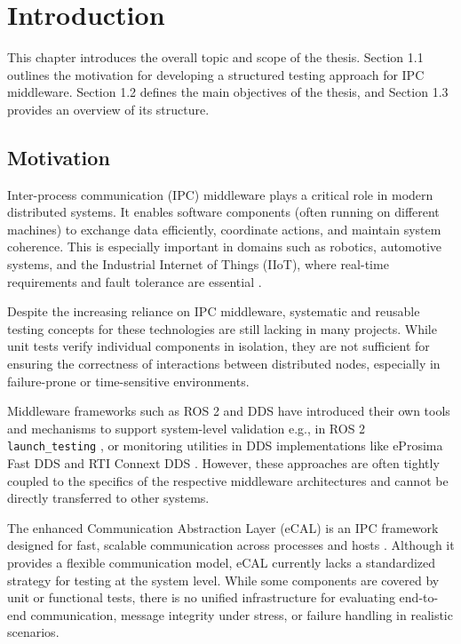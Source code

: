 \clearpage

\section{Introduction}

This chapter introduces the overall topic and scope of the thesis. Section 1.1 outlines the motivation for developing a structured testing approach for IPC middleware. Section 1.2 defines the main objectives of the thesis, and Section 1.3 provides an overview of its structure.

\subsection{Motivation}

Inter-process communication (IPC) middleware plays a critical role in modern distributed systems. It enables software components (often running on different machines) to exchange data efficiently, coordinate actions, and maintain system coherence. This is especially important in domains such as robotics, automotive systems, and the Industrial Internet of Things (IIoT), where real-time requirements and fault tolerance are essential \cite{coulouris2012}.

\vspace{1em}
Despite the increasing reliance on IPC middleware, systematic and reusable testing concepts for these technologies are still lacking in many projects. While unit tests verify individual components in isolation, they are not sufficient for ensuring the correctness of interactions between distributed nodes, especially in failure-prone or time-sensitive environments.

\vspace{1em}
Middleware frameworks such as ROS 2 and DDS have introduced their own tools and mechanisms to support system-level validation e.g., in ROS 2  \texttt{launch\_testing} \cite{ros2_launch_testing}, or monitoring utilities in DDS implementations like eProsima Fast DDS and RTI Connext DDS \cite{eprosima_fast_dds, rti_connext_dds}. However, these approaches are often tightly coupled to the specifics of the respective middleware architectures and cannot be directly transferred to other systems.

\vspace{1em}
The enhanced Communication Abstraction Layer (eCAL) is an IPC framework designed for fast, scalable communication across processes and hosts \cite{ecal_github}. Although it provides a flexible communication model, eCAL currently lacks a standardized strategy for testing at the system level. While some components are covered by unit or functional tests, there is no unified infrastructure for evaluating end-to-end communication, message integrity under stress, or failure handling in realistic scenarios.


